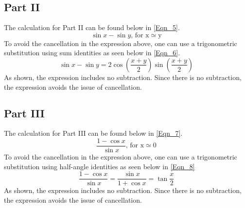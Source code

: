 \documentclass{article}
\begin{document}
\subsection{Part II}
The calculation for Part II can be found below in \ref{Eqn_5}.
\begin{equation}
    \label{Eqn_5}
    \sin{x} - \sin{y} \mbox{, for x} \simeq \mbox{y}
\end{equation}
To avoid the cancellation in the expression above, one can use a trigonometric substitution using sum identities as seen below in \ref{Eqn_6}.
\begin{equation}
    \label{Eqn_6}
    \sin{x} - \sin{y} = 2\cos{(\frac{x+y}{2})}\sin{(\frac{x+y}{2})}
\end{equation}
As shown, the expression includes no subtraction. Since there is no subtraction, the expression avoids the issue of cancellation.

\subsection{Part III}
The calculation for Part III can be found below in \ref{Eqn_7}.
\begin{equation}
    \label{Eqn_7}
    \frac{1-\cos{x}}{\sin{x}} \mbox{, for x} \simeq \mbox{0}
\end{equation}
To avoid the cancellation in the expression above, one can use a trigonometric substitution using half-angle identities as seen below in \ref{Eqn_8}
\begin{equation}
    \label{Eqn_8}
    \frac{1-\cos{x}}{\sin{x}} = \frac{\sin{x}}{1+\cos{x}} = \tan{\frac{x}{2}}
\end{equation}
As shown, the expression includes no subtraction. Since there is no subtraction, the expression avoids the issue of cancellation.
\end{document}
